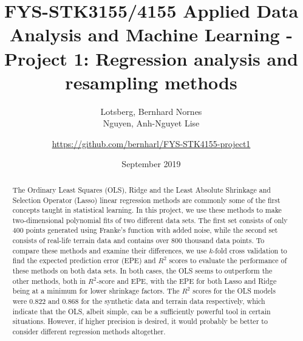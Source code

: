 \documentclass[a4paper, 10pt]{article}
\title{FYS-STK3155/4155 Applied Data Analysis and Machine Learning - Project 1: Regression analysis and resampling methods }
\author{Lotsberg, Bernhard Nornes \\ Nguyen, Anh-Nguyet Lise \and \url{https://github.com/bernharl/FYS-STK4155-project1}}
\date{September 2019}
\begin{document}
\maketitle


\begin{abstract} \noindent
 The Ordinary Least Squares (OLS), Ridge and  the Least Absolute Shrinkage and Selection Operator (Lasso) linear regression methods are commonly some of the first concepts taught in statistical learning. In this project, 
we use these methods to make two-dimensional polynomial fits of two different data sets. The first set consists of only 400 points generated using Franke's function \cite{franke1979critical} with added noise, while the second set consists of real-life terrain data and contains over 800 thousand data points. To compare these methods and examine their differences, we use $k$-fold cross validation to find the expected prediction error (EPE) and $R^2$ scores to evaluate the performance of these methods on both data sets. In both cases, the OLS seems to outperform the other methods, both in $R^2$-score and EPE, with the EPE for both Lasso and Ridge being at a minimum for lower shrinkage factors. The $R^2$ scores for the OLS models were 0.822 and 0.868 for the synthetic data and terrain data respectively, which indicate that the OLS, albeit simple, can be a  sufficiently powerful tool in certain situations. However, if higher precision is desired, it would probably be better to consider different regression methods altogether. 
\end{abstract}
\end{document}
